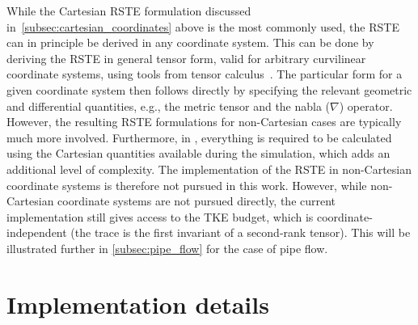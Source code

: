 While the Cartesian RSTE formulation discussed in~\ref{subsec:cartesian_coordinates} above is the most commonly used, the RSTE can in principle be derived in any coordinate system.
This can be done by deriving the RSTE in general tensor form, valid for arbitrary curvilinear coordinate systems, using tools from tensor calculus~\cite{moser1984direct}.
The particular form for a given coordinate system then follows directly by specifying the relevant geometric and differential quantities, e.g., the metric tensor and the nabla ($\nabla$) operator.
However, the resulting RSTE formulations for non-Cartesian cases are typically much more involved.
Furthermore, in \OF, everything is required to be calculated using the Cartesian quantities available during the simulation, which adds an additional level of complexity.
The implementation of the RSTE in non-Cartesian coordinate systems is therefore not pursued in this work.
However, while non-Cartesian coordinate systems are not pursued directly, the current implementation still gives access to the TKE budget, which is coordinate-independent (the trace is the first invariant of a second-rank tensor).
This will be illustrated further in \ref{subsec:pipe_flow} for the case of pipe flow.

\section{Implementation details}
\label{sec:implementation}

